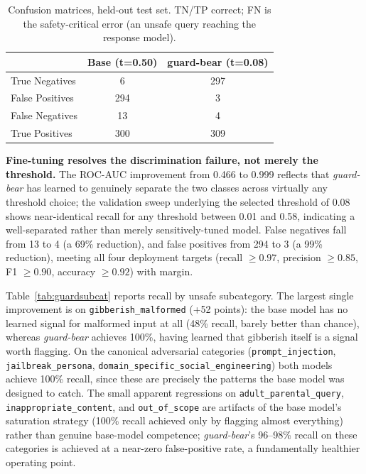 \documentclass[pdflatex,sn-mathphys-num]{sn-jnl}%
\begin{document}
\begin{table}[!h]
  \centering
  \caption{Confusion matrices, held-out test set. TN/TP correct; FN is the safety-critical error (an unsafe query reaching the response model).}
  \label{tab:guardconfusion}
  \small
  \begin{tabular}{@{}lcc@{}}
    \toprule
    & Base (t=0.50) & guard-bear (t=0.08) \\
    \midrule
    True Negatives  & 6   & 297 \\
    False Positives & 294 & 3   \\
    False Negatives & 13  & 4   \\
    True Positives  & 300 & 309 \\
    \bottomrule
  \end{tabular}
\end{table}

\textbf{Fine-tuning resolves the discrimination failure, not merely the threshold.} The ROC-AUC improvement from 0.466 to 0.999 reflects that \textit{guard-bear} has learned to genuinely separate the two classes across virtually any threshold choice; the validation sweep underlying the selected threshold of 0.08 shows near-identical recall for any threshold between 0.01 and 0.58, indicating a well-separated rather than merely sensitively-tuned model. False negatives fall from 13 to 4 (a 69\% reduction), and false positives from 294 to 3 (a 99\% reduction), meeting all four deployment targets (recall $\geq 0.97$, precision $\geq 0.85$, F1 $\geq 0.90$, accuracy $\geq 0.92$) with margin.

Table~\ref{tab:guardsubcat} reports recall by unsafe subcategory. The largest single improvement is on \texttt{gibberish\_malformed} (+52 points): the base model has no learned signal for malformed input at all (48\% recall, barely better than chance), whereas \textit{guard-bear} achieves 100\%, having learned that gibberish itself is a signal worth flagging. On the canonical adversarial categories (\texttt{prompt\_injection}, \texttt{jailbreak\_persona}, \texttt{domain\_specific\_social\_engineering}) both models achieve 100\% recall, since these are precisely the patterns the base model was designed to catch. The small apparent regressions on \texttt{adult\_parental\_query}, \texttt{inappropriate\_content}, and \texttt{out\_of\_scope} are artifacts of the base model's saturation strategy (100\% recall achieved only by flagging almost everything) rather than genuine base-model competence; \textit{guard-bear}'s 96--98\% recall on these categories is achieved at a near-zero false-positive rate, a fundamentally healthier operating point.
\end{document}
